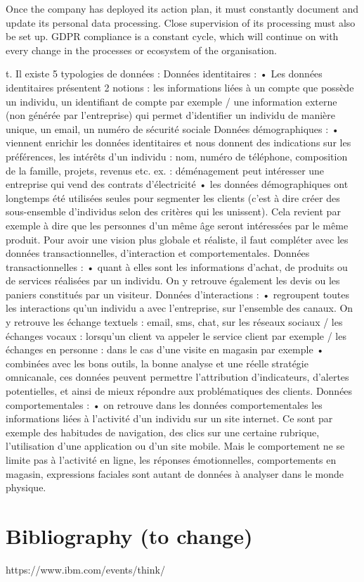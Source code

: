 \begin{itemize}
Once the company has deployed its action plan, it must constantly document and update its personal data processing. Close supervision of its processing must also be set up. GDPR compliance is a constant cycle, which will continue on with every change in the processes or ecosystem of the organisation.




t. Il existe 5 typologies de données :
Données identitaires :
• Les données identitaires présentent 2 notions : les informations liées à un compte
que possède un individu, un identifiant de compte par exemple / une information
externe (non générée par l’entreprise) qui permet d’identifier un individu de manière
unique, un email, un numéro de sécurité sociale
Données démographiques :
• viennent enrichir les données identitaires et nous donnent des indications sur les
préférences, les intérêts d’un individu : nom, numéro de téléphone, composition de
la famille, projets, revenus etc. ex. : déménagement peut intéresser une entreprise
qui vend des contrats d’électricité
• les données démographiques ont longtemps été utilisées seules pour segmenter les
clients (c’est à dire créer des sous-ensemble d’individus selon des critères qui les
unissent). Cela revient par exemple à dire que les personnes d’un même âge seront
intéressées par le même produit. Pour avoir une vision plus globale et réaliste, il faut
compléter avec les données transactionnelles, d’interaction et comportementales.
Données transactionnelles :
• quant à elles sont les informations d’achat, de produits ou de services réalisées par
un individu. On y retrouve également les devis ou les paniers constitués par un
visiteur.
Données d’interactions :
• regroupent toutes les interactions qu’un individu a avec l’entreprise, sur l’ensemble
des canaux. On y retrouve les échange textuels : email, sms, chat, sur les réseaux
sociaux / les échanges vocaux : lorsqu’un client va appeler le service client par
exemple / les échanges en personne : dans le cas d’une visite en magasin par
exemple
• combinées avec les bons outils, la bonne analyse et une réelle stratégie omnicanale,
ces données peuvent permettre l'attribution d’indicateurs, d’alertes potentielles, et
ainsi de mieux répondre aux problématiques des clients.
Données comportementales :
• on retrouve dans les données comportementales les informations liées à l’activité
d’un individu sur un site internet. Ce sont par exemple des habitudes de navigation,
des clics sur une certaine rubrique, l’utilisation d’une application ou d’un site mobile.
Mais le comportement ne se limite pas à l’activité en ligne, les réponses
émotionnelles, comportements en magasin, expressions faciales sont autant de
données à analyser dans le monde physique.
\section{Bibliography (to change)}
https://www.ibm.com/events/think/
\blindtext
\end{itemize}



